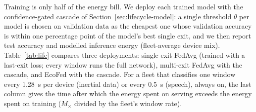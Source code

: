 Training is only half of the energy bill. We deploy each trained model with the confidence-gated cascade of Section~\ref{sec:lifecycle-model}: a single threshold $\theta$ per model is chosen on validation data as the cheapest one whose validation accuracy is within one percentage point of the model's best single exit, and we then report test accuracy and modelled inference energy (fleet-average device mix). Table~\ref{tab:life} compares three deployments: single-exit FedAvg (trained with a last-exit loss; every window runs the full network), multi-exit FedAvg with the cascade, and EcoFed with the cascade. For a fleet that classifies one window every 1.28~s per device (inertial data) or every 0.5~s (speech), always on, the last column gives the time after which the energy spent on serving exceeds the energy spent on training ($M_\times$ divided by the fleet's window rate).

\begin{table}[t]
\centering\scriptsize
\caption{Lifecycle energy (means over 16 seeds). Test acc.: accuracy of the deployed cascade (single exit for the first row). $E_{train}$: fleet energy used for training. $\bar e_{inf}$: expected inference energy per window. $M_\times=E_{train}/\bar e_{inf}$: number of inferences after which serving costs as much as training did.}\label{tab:life}
\setlength{\tabcolsep}{3pt}
\resizebox{\textwidth}{!}{}
\end{table}


